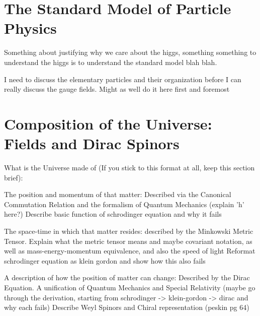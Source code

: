\section{The Standard Model of Particle Physics}

    Something about justifying why we care about the higgs,
    something something to understand the higgs is to understand the standard model blah blah.

       I need to discuss the elementary particles and their organization before I can really discuss the gauge fields.
       Might as well do it here first and foremost


\section{Composition of the Universe: Fields and Dirac Spinors}

    What is the Universe made of (If you stick to this format at all, keep this section brief):

       The position and momentum of that matter:
           Described via the Canonical Commutation Relation and the formalism of Quantum Mechanics
           (explain 'h' here?)
       Describe basic function of schrodinger equation and why it fails

       The space-time in which that matter resides: described by the Minkowski Metric Tensor.
        Explain what the metric tensor means and maybe covariant notation,
        as well as mass-energy-momentum equivalence,
        and also the speed of light
        Reformat schrodinger equation as klein gordon and show how this also fails


       A description of how the position of matter can change: Described by the Dirac Equation.
        A unification of Quantum Mechanics and Special Relativity
        (maybe go through the derivation, starting from schrodinger -> klein-gordon -> dirac and why each fails)
        Describe Weyl Spinors and Chiral representation (peskin pg 64)



